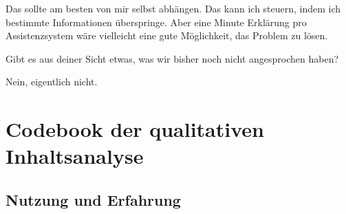 Das sollte am besten von mir selbst abhängen. Das kann ich steuern,
indem ich bestimmte Informationen überspringe. Aber eine Minute
Erklärung pro Assistenzsystem wäre vielleicht eine gute Möglichkeit,
das Problem zu lösen.

\interviewerin
Gibt es aus deiner Sicht etwas, was wir bisher noch nicht angesprochen
haben?

Nein, eigentlich nicht.


\clearpage

\section{Codebook der qualitativen Inhaltsanalyse}
\label{sec:codebook}


\subsection{Nutzung und Erfahrung}
\label{subsec:codebook-nutzung-erfahrung}

